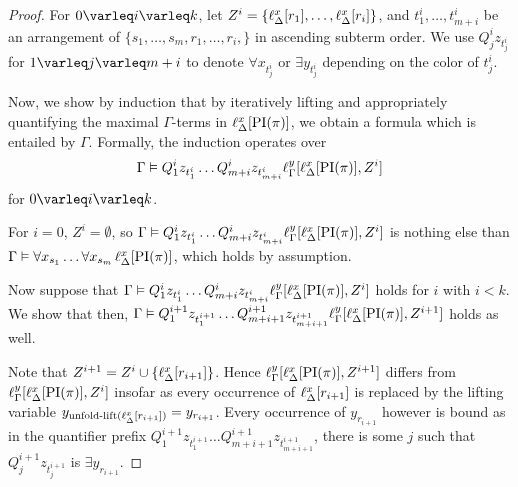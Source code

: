 \begin{proof}
	For $0\varleq i \varleq k$,
	let $Z^i = \{ \ell_{\Delta}^{x}[r_1], \dots, \ell_{\Delta}^{x}[r_i] \}$,
	and
	$t_1^i, \dots, t_{m+i}^i$ be an arrangement of $ \{ s_1, \dots, s_m, r_1, \dots, r_i,  \}$ in ascending subterm order.
	We use $Q_j^i z_{t_j^i}$ for $1\varleq j \varleq m+i$ to denote $\forall x_{t_j^i}$ or $\exists y_{t_j^i}$ depending on the color of $t_j^i$.

	Now, we show by induction that by iteratively lifting and appropriately quantifying the maximal $\Gamma$-terms in $\ell_{\Delta}^{x}[\operatorname{PI}(\pi)]$, we obtain a formula which is entailed by $\Gamma$.
	Formally, the induction operates over \[\Gamma \vDash Q_1^i z_{t_1^i} \dots Q_{m+i}^i z_{t_{m+i}^i} \ell_{\Gamma}^{y}[ \ell_{\Delta}^{x}[\operatorname{PI}(\pi) ], Z^i ]\] for $0 \varleq i \varleq k$.

	For $i=0$, $Z^i = \emptyset$, so $\Gamma \vDash Q_1^i z_{t_1^i} \dots Q_{m+i}^i z_{t_{m+i}^i} \ell_{\Gamma}^{y}[ \ell_{\Delta}^{x}[\operatorname{PI}(\pi) ], Z^i ]$ is nothing else than $\Gamma \vDash \forall x_{s_1} \ldots \forall x_{s_m}\,\ell_{\Delta}^{x}[\operatorname{PI}(\pi)]$, which holds by assumption.

	Now suppose that $\Gamma \vDash Q_1^i z_{t_1^i} \dots Q_{m+i}^i z_{t_{m+i}^i} \ell_{\Gamma}^{y}[ \ell_{\Delta}^{x}[\operatorname{PI}(\pi) ], Z^i ]$ holds for $i$ with $i < k$.
	We show that then, $\Gamma \vDash Q_1^{i+1} z_{t_1^{i+1}} \dots Q_{m+{i+1}}^{i+1} z_{t_{m+{i+1}}^{i+1}} \ell_{\Gamma}^{y}[ \ell_{\Delta}^{x}[\operatorname{PI}(\pi) ], Z^{i+1} ]$ holds as well.

	Note that $Z^{i+1} = Z^i \cup \{ \ell_{\Delta}^{x}[r_{i+1}] \}$. 
	Hence $\ell_{\Gamma}^{y}[ \ell_{\Delta}^{x}[\operatorname{PI}(\pi) ], Z^{i+1} ]$ differs from $\ell_{\Gamma}^{y}[ \ell_{\Delta}^{x}[\operatorname{PI}(\pi) ], Z^i ]$ insofar as every occurrence of $\ell_{\Delta}^{x}[r_{i+1}]$ is replaced by the lifting variable $y_{\operatorname{unfold-lift}(\ell_{\Delta}^{x}[r_{i+1}])} = y_{r_{i+1}}$. 
	Every occurrence of $y_{r_{i+1}}$ however is bound as 
	in the quantifier prefix
	$Q_1^{i+1} z_{t_1^{i+1}} \dots Q_{m+{i+1}}^{i+1} z_{t_{m+{i+1}}^{i+1}}$, there is some $j$ such that $Q_j^{i+1} z_{t_j^{i+1}}$ is $\exists y_{r_{i+1}}$.


\end{proof}
